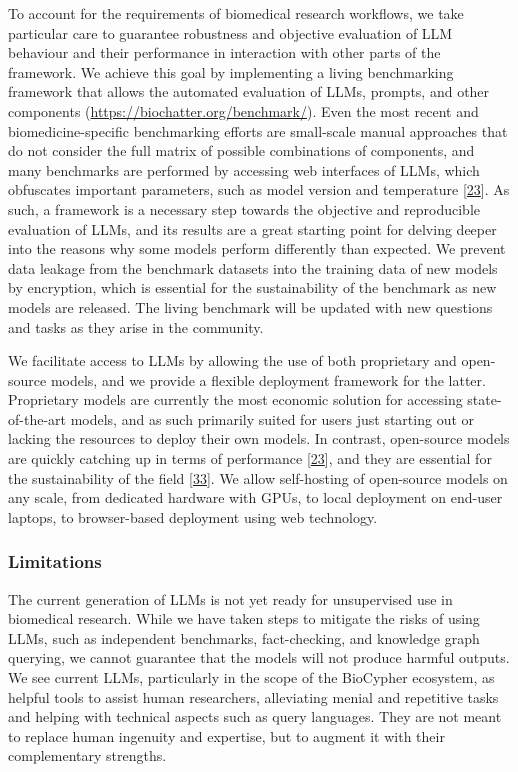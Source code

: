 To account for the requirements of biomedical research workflows, we take particular care to guarantee robustness and objective evaluation of LLM behaviour and their performance in interaction with other parts of the framework.
We achieve this goal by implementing a living benchmarking framework that allows the automated evaluation of LLMs, prompts, and other components (\url{https://biochatter.org/benchmark/}).
Even the most recent and biomedicine-specific benchmarking efforts are small-scale manual approaches that do not consider the full matrix of possible combinations of components, and many benchmarks are performed by accessing web interfaces of LLMs, which obfuscates important parameters, such as model version and temperature {[}\protect\hyperlink{ref-uYvzQA7w}{23}{]}.
As such, a framework is a necessary step towards the objective and reproducible evaluation of LLMs, and its results are a great starting point for delving deeper into the reasons why some models perform differently than expected.
We prevent data leakage from the benchmark datasets into the training data of new models by encryption, which is essential for the sustainability of the benchmark as new models are released.
The living benchmark will be updated with new questions and tasks as they arise in the community.

We facilitate access to LLMs by allowing the use of both proprietary and open-source models, and we provide a flexible deployment framework for the latter.
Proprietary models are currently the most economic solution for accessing state-of-the-art models, and as such primarily suited for users just starting out or lacking the resources to deploy their own models.
In contrast, open-source models are quickly catching up in terms of performance {[}\protect\hyperlink{ref-uYvzQA7w}{23}{]}, and they are essential for the sustainability of the field {[}\protect\hyperlink{ref-BXdkfGlr}{33}{]}.
We allow self-hosting of open-source models on any scale, from dedicated hardware with GPUs, to local deployment on end-user laptops, to browser-based deployment using web technology.

\hypertarget{limitations}{%
\subsubsection{Limitations}\label{limitations}}

The current generation of LLMs is not yet ready for unsupervised use in biomedical research.
While we have taken steps to mitigate the risks of using LLMs, such as independent benchmarks, fact-checking, and knowledge graph querying, we cannot guarantee that the models will not produce harmful outputs.
We see current LLMs, particularly in the scope of the BioCypher ecosystem, as helpful tools to assist human researchers, alleviating menial and repetitive tasks and helping with technical aspects such as query languages.
They are not meant to replace human ingenuity and expertise, but to augment it with their complementary strengths.

